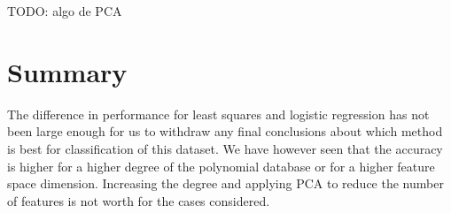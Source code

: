 \documentclass[10pt,conference,compsocconf]{IEEEtran}
\begin{document}
  TODO: algo de PCA

\section{Summary}
\label{sec:tips-writing}
  The difference in performance for least squares and logistic regression has not been large enough for us to withdraw any final conclusions about which method is best for classification of this dataset. We have however seen that the accuracy is higher for a higher degree of the polynomial database or for a higher feature space dimension. Increasing the degree and applying PCA to reduce the number of features is not worth for the cases considered.



\end{document}
